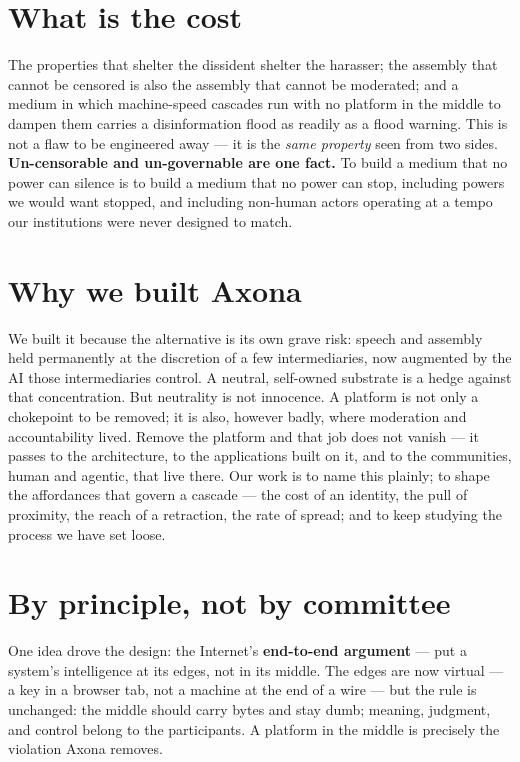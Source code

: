 \documentclass[nobib]{tufte-handout}
\begin{document}
\section*{What is the cost}

The properties that shelter the dissident shelter the harasser; the assembly
that cannot be censored is also the assembly that cannot be moderated; and a
medium in which machine-speed cascades run with no platform in the middle to
dampen them carries a disinformation flood as readily as a flood
warning. This is not a flaw to be engineered away --- it is the \emph{same
property} seen from two sides. \textbf{Un-censorable and un-governable are one
fact.} To build a medium that no power can silence is to build a medium that no
power can stop, including powers we would want stopped, and including non-human
actors operating at a tempo our institutions were never designed to match.

\section*{Why we built Axona}

We built it because the alternative is its own grave risk: speech and assembly
held permanently at the discretion of a few intermediaries, now augmented by the
AI those intermediaries control. A neutral, self-owned substrate is a hedge
against that concentration. But neutrality is not innocence. A platform is not
only a chokepoint to be removed; it is also, however badly, where moderation and
accountability lived. Remove the platform and that job does not vanish --- it
passes to the architecture, to the applications built on it, and to the
communities, human and agentic, that live there. Our work is to name this
plainly; to shape the affordances that govern a cascade --- the cost of an
identity, the pull of proximity, the reach of a retraction, the rate of spread;
and to keep studying the process we have set loose.

\section*{By principle, not by committee}

One idea drove the design: the Internet's \textbf{end-to-end argument} --- put a
system's intelligence at its edges, not in its middle. The edges are now
virtual --- a key in a browser tab, not a machine at the end of a wire --- but
the rule is unchanged: the middle should carry bytes and stay dumb; meaning,
judgment, and control belong to the participants. A platform in the middle is
precisely the violation Axona removes.
\end{document}
